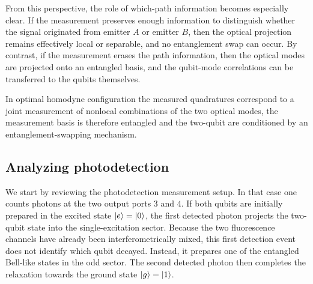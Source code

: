From this perspective, the role of which-path information becomes especially clear. If the measurement preserves enough information to distinguish whether the signal originated from emitter \(A\) or emitter \(B\), then the optical projection remains effectively local or separable, and no entanglement swap can occur. By contrast, if the measurement erases the path information, then the optical modes are projected onto an entangled basis, and the qubit-mode correlations can be transferred to the qubits themselves.

In optimal homodyne configuration the measured quadratures correspond to a joint measurement of nonlocal combinations of the two optical modes, the measurement basis is therefore entangled and the two-qubit are conditioned by an entanglement-swapping mechanism.



\subsection{Analyzing photodetection}

We start by reviewing the photodetection measurement setup. In that case one counts photons at the two output ports \(3\) and \(4\). If both qubits are initially prepared in the excited state $\ket{e}=\ket{0}$, the first detected photon projects the two-qubit state into the single-excitation sector. Because the two fluorescence channels have already been interferometrically mixed, this first detection event does not identify which qubit decayed. Instead, it prepares one of the entangled Bell-like states in the odd sector. The second detected photon then completes the relaxation towards the ground state $\ket{g}=\ket{1}$.

